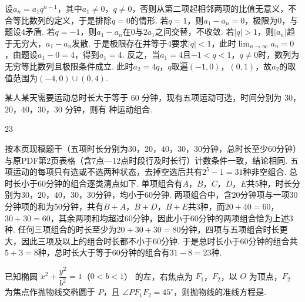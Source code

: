 \begin{solution}
设\(a_n=a_1q^{n-1}\)，其中\(a_1\ne 0\)，\(q\ne 0\)，否则从第二项起相邻两项的比值无意义，不合等比数列的定义，于是排除\(q=0\)的情形. 若\(q=1\)，则\(a_1-a_n=0\)，极限为\(0\)，与题设\(4\)矛盾. 若\(q=-1\)，则\(a_1-a_n\)在\(0\)与\(2a_1\)之间交替，不收敛. 若\(\left| q \right|>1\)，则\(\left| a_n \right|\)趋于无穷大，\(a_1-a_n\)发散. 于是极限存在并等于\(4\)要求\(\left| q \right|<1\)，此时\(\displaystyle\lim_{n\to\infty}a_n=0\)，由题设\(a_1-0=4\)，得到\(a_1=4\). 反之，当\(a_1=4\)且\(-1<q<1\)，\(q\ne 0\)时，数列为无穷等比数列且极限条件成立. 此时\(a_2=4q\)，\(q\)取遍\(\left( -1,0 \right)\)，\(\left( 0,1 \right)\)，故\(a_2\)的取值范围为\(\left( -4,0 \right)\cup\left( 0,4 \right)\).
\end{solution}

\begin{problem}
某人某天需要运动总时长大于等于 \(60\) 分钟，现有五项运动可选，时间分别为 \(30\)，\(20\)，\(40\)，\(30\)，\(30\) 分钟，则有\fillinblank{} 种运动组合.
\end{problem}

\begin{answer}
\(23\)
\end{answer}

\begin{solution}
按本页现稿题干（五项时长分别为\(30\)，\(20\)，\(40\)，\(30\)，\(30\)分钟，总时长至少\(60\)分钟）与原PDF第2页表格（含7点—12点时段行及时长行）计数条件一致，结论相同. 五项运动的每项只有选或不选两种状态，去掉空选后共有\(2^5-1=31\)种非空组合. 总时长小于\(60\)分钟的组合逐类清点如下. 单项组合有\(A\)，\(B\)，\(C\)，\(D\)，\(E\)共\(5\)种，时长分别为\(30\)，\(20\)，\(40\)，\(30\)，\(30\)分钟，均小于\(60\)分钟. 两项组合中，含\(20\)分钟项与一项\(30\)分钟项的和为\(50\)分钟，共有\(B+A\)，\(B+D\)，\(B+E\)共\(3\)种，而\(20+40=60\)，\(30+30=60\)，其余两项和均超过\(60\)分钟，因此小于\(60\)分钟的两项组合恰为上述\(3\)种. 任何三项组合的时长至少为\(20+30+30=80\)分钟，四项与五项组合时长更大，因此三项及以上的组合时长都不小于\(60\)分钟. 于是总时长小于\(60\)分钟的组合共\(5+3=8\)种，总时长大于等于\(60\)分钟的组合有\(31-8=23\)种.
\end{solution}

\begin{problem}
已知椭圆 \(x^2+\dfrac{y^2}{b^2}=1\)（\(0<b<1\)） 的左，右焦点为 \(F_1\)，\(F_2\)，以 \(O\) 为顶点，\(F_2\) 为焦点作抛物线交椭圆于 \(P\)，且 \(\angle PF_1F_2=45^\circ\)，则抛物线的准线方程是\fillinblank{}.
\end{problem}

